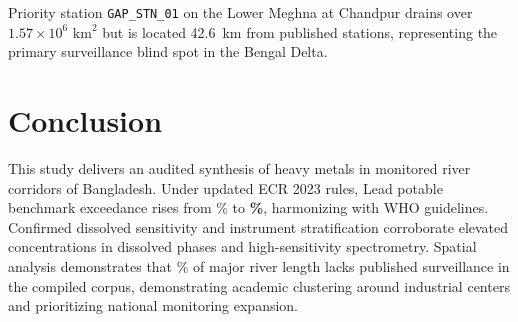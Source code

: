 \documentclass[conference]{IEEEtran}
\begin{document}
\begin{table}[htbp]
\centering
\caption{Candidate Surveillance Reaches in Unsampled River Sectors}
\label{tab:gaps}
\end{table}

Priority station \texttt{GAP\_STN\_01} on the Lower Meghna at Chandpur drains over $1.57 \times 10^6\text{ km}^2$ but is located 42.6~km from published stations, representing the primary surveillance blind spot in the Bengal Delta.

\section{Conclusion}
This study delivers an audited synthesis of heavy metals in monitored river corridors of Bangladesh. Under updated ECR 2023 rules, Lead potable benchmark exceedance rises from \LeadBdNineteenNinetySevenExceedPct\% to \textbf{\LeadBdTwentyTwentyThreeExceedPct\%}, harmonizing with WHO guidelines. Confirmed dissolved sensitivity and instrument stratification corroborate elevated concentrations in dissolved phases and high-sensitivity spectrometry. Spatial analysis demonstrates that \UnsampledPctLengthTwentyFiveKm\% of major river length lacks published surveillance in the compiled corpus, demonstrating academic clustering around industrial centers and prioritizing national monitoring expansion.



\end{document}
